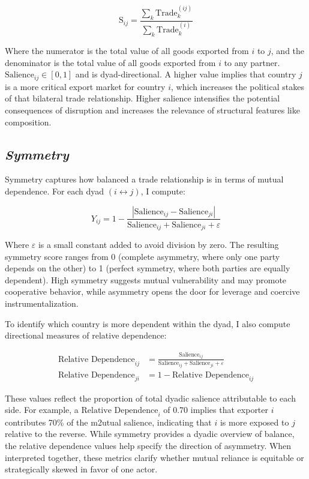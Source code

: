 \documentclass[12pt]{article}
\begin{document}
\begin{equation}
\text{S}_{ij} = \frac{ \sum_k \text{Trade}_k^{(ij)} }{ \sum_k \text{Trade}_k^{(i)} }
\end{equation}

Where the numerator is the total value of all goods exported from $i$ to $j$, and the denominator is the total value of all goods exported from $i$ to any partner. $\text{Salience}_{ij} \in [0,1]$ and is dyad-directional. A higher value implies that country $j$ is a more critical export market for country $i$, which increases the political stakes of that bilateral trade relationship. Higher salience intensifies the potential consequences of disruption and increases the relevance of structural features like composition.

\subsection*{\textit{Symmetry}}

Symmetry captures how balanced a trade relationship is in terms of mutual dependence. For each dyad $(i \leftrightarrow j)$, I compute:

\begin{equation}
Y_{ij} = 1 - \frac{ \left| \text{Salience}_{ij} - \text{Salience}_{ji} \right| }{ \text{Salience}_{ij} + \text{Salience}_{ji} + \varepsilon }
\end{equation}


Where $\varepsilon$ is a small constant added to avoid division by zero. The resulting symmetry score ranges from 0 (complete asymmetry, where only one party depends on the other) to 1 (perfect symmetry, where both parties are equally dependent). High symmetry suggests mutual vulnerability and may promote cooperative behavior, while asymmetry opens the door for leverage and coercive instrumentalization.

To identify which country is more dependent within the dyad, I also compute directional measures of relative dependence:

\begin{align}
\text{Relative Dependence}_{ij} &= \frac{\text{Salience}_{ij}}{\text{Salience}_{ij} + \text{Salience}_{ji} + \varepsilon} \\
\text{Relative Dependence}_{ji} &= 1 - \text{Relative Dependence}_{ij}
\end{align}

These values reflect the proportion of total dyadic salience attributable to each side. For example, a $\text{Relative Dependence}_i$ of 0.70 implies that exporter $i$ contributes 70\% of the m2utual salience, indicating that $i$ is more exposed to $j$ relative to the reverse. While symmetry provides a dyadic overview of balance, the relative dependence values help specify the direction of asymmetry. When interpreted together, these metrics clarify whether mutual reliance is equitable or strategically skewed in favor of one actor.
\end{document}
